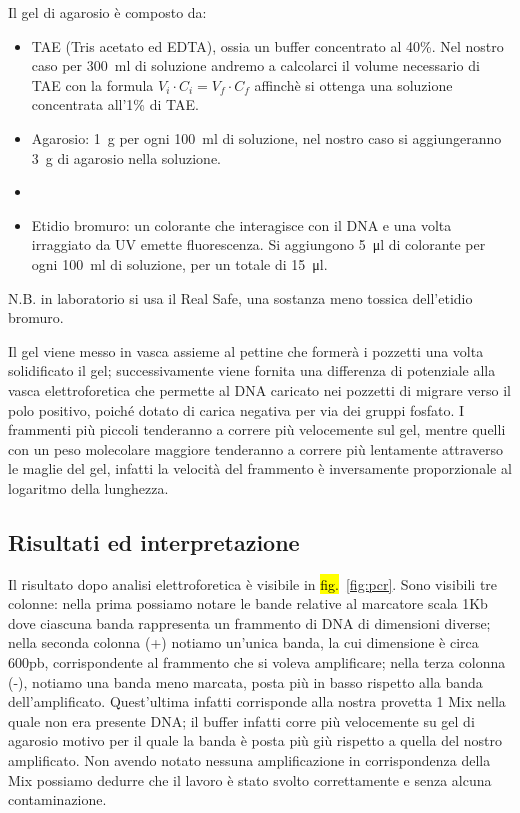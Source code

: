 \documentclass[twocolumn,a4paper,10pt]{my_report}
\begin{document}
Il gel di agarosio è composto da:
\begin{itemize}
    \item TAE (Tris acetato ed EDTA), ossia un buffer concentrato al 40\%. Nel nostro caso per \SI{300}{\ml} di soluzione andremo a calcolarci il volume necessario di TAE con la formula $V_i \cdot C_i = V_f \cdot C_f$ affinchè si ottenga una soluzione concentrata all’1\% di TAE.
    \item Agarosio: \SI{1}{\gram} per ogni \SI{100}{\ml} di soluzione, nel nostro caso si aggiungeranno \SI{3}{\gram} di agarosio nella soluzione.
    \item {}
    \item Etidio bromuro: un colorante che interagisce con il DNA e una volta irraggiato da UV emette fluorescenza. Si aggiungono \SI{5}{\ul} di colorante per ogni \SI{100}{\ml} di soluzione, per un totale di \SI{15}{\ul}.
\end{itemize}
N.B. in laboratorio si usa il Real Safe, una sostanza meno tossica dell’etidio bromuro.

Il gel viene messo in vasca assieme al pettine che formerà i pozzetti una volta solidificato il gel; successivamente viene fornita una differenza di potenziale alla vasca elettroforetica che permette al DNA caricato nei pozzetti di migrare verso il polo positivo, poiché dotato di carica negativa per via dei gruppi fosfato.
I frammenti più piccoli tenderanno a correre più velocemente sul gel, mentre quelli con un peso molecolare maggiore tenderanno a correre più lentamente attraverso le maglie del gel, infatti la velocità del frammento è inversamente proporzionale al logaritmo della lunghezza.

\subsection{Risultati ed interpretazione}
Il risultato dopo analisi elettroforetica è visibile in \hl{fig.}~\ref{fig:pcr}.
Sono visibili tre colonne: nella prima possiamo notare le bande relative al marcatore scala 1Kb dove ciascuna banda rappresenta un frammento di DNA di dimensioni diverse; nella seconda colonna (+) notiamo un'unica banda, la cui dimensione è circa 600pb, corrispondente al frammento che si voleva amplificare; nella terza colonna (-), notiamo una banda meno marcata, posta più in basso rispetto alla banda dell’amplificato.
Quest’ultima infatti corrisponde alla nostra provetta 1 Mix nella quale non era presente DNA; il buffer infatti corre più velocemente su gel di agarosio motivo per il quale la banda è posta più giù rispetto a quella del nostro amplificato.
Non avendo notato nessuna amplificazione in corrispondenza della Mix possiamo dedurre che il lavoro è stato svolto correttamente e senza alcuna contaminazione.
\end{document}
